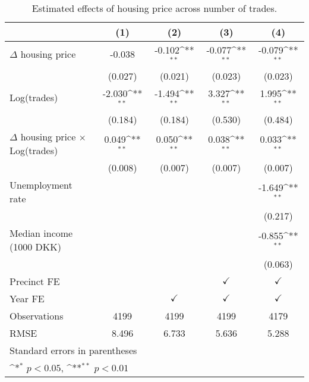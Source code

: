 \begin{table}[htbp]\centering
\def\sym#1{\ifmmode^{#1}\else\(^{#1}\)\fi}
\caption{Estimated effects of housing price across number of trades.} \label{table:econactivity}
\begin{tabular}{l*{4}{c}}
\hline\hline
                    &\multicolumn{1}{c}{(1)}        &\multicolumn{1}{c}{(2)}        &\multicolumn{1}{c}{(3)}        &\multicolumn{1}{c}{(4)}        \\
\hline
$\Delta$ housing price&      -0.038        &      -0.102\sym{**}&      -0.077\sym{**}&      -0.079\sym{**}\\
                    &     (0.027)        &     (0.021)        &     (0.023)        &     (0.023)        \\
[1em]
Log(trades)         &      -2.030\sym{**}&      -1.494\sym{**}&       3.327\sym{**}&       1.995\sym{**}\\
                    &     (0.184)        &     (0.184)        &     (0.530)        &     (0.484)        \\
[1em]
$\Delta$ housing price $\times$ Log(trades)&       0.049\sym{**}&       0.050\sym{**}&       0.038\sym{**}&       0.033\sym{**}\\
                    &     (0.008)        &     (0.007)        &     (0.007)        &     (0.007)        \\
[1em]
Unemployment rate   &                    &                    &                    &      -1.649\sym{**}\\
                    &                    &                    &                    &     (0.217)        \\
[1em]
Median income (1000 DKK)&                    &                    &                    &      -0.855\sym{**}\\
                    &                    &                    &                    &     (0.063)        \\
[1em]
\hline Precinct FE  &                    &                    &$\checkmark$        &$\checkmark$        \\
[1em]
Year FE             &                    &$\checkmark$        &$\checkmark$        &$\checkmark$        \\
\hline
Observations        &        4199        &        4199        &        4199        &        4179        \\
RMSE                &       8.496        &       6.733        &       5.636        &       5.288        \\
\hline\hline
\multicolumn{5}{l}{\footnotesize Standard errors in parentheses}\\
\multicolumn{5}{l}{\footnotesize \sym{*} \(p<0.05\), \sym{**} \(p<0.01\)}\\
\end{tabular}
\end{table}
